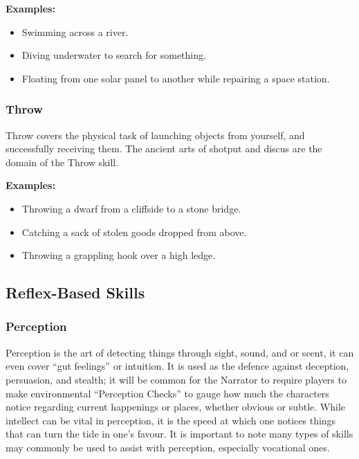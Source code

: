 \begin{displayquote}
    \textbf{Examples:}
    \begin{itemize}
        \item Swimming across a river.
        \item Diving underwater to search for something.
        \item Floating from one solar panel to another while repairing a space station.
    \end{itemize}
\end{displayquote}

\subsubsection{Throw} \label{subsubsec:throw}

Throw covers the physical task of launching objects from yourself, and successfully receiving them. The ancient arts of shotput and discus are the domain of the Throw skill.

\begin{displayquote}
    \textbf{Examples:}
    \begin{itemize}
        \item Throwing a dwarf from a cliffside to a stone bridge.
        \item Catching a sack of stolen goods dropped from above.
        \item Throwing a grappling hook over a high ledge.
    \end{itemize}
\end{displayquote}

\subsection{Reflex-Based Skills} \label{subsec:reflex-based_skills}

\subsubsection{Perception} \label{subsubsec:perception}

Perception is the art of detecting things through sight, sound, and or scent, it can even cover “gut feelings” or intuition. It is used as the defence against deception, persuasion, and stealth; it will be common for the Narrator to require players to make environmental “Perception Checks” to gauge how much the characters notice regarding current happenings or places, whether obvious or subtle. While intellect can be vital in perception, it is the speed at which one notices things that can turn the tide in one’s favour. It is important to note many types of skills may commonly be used to assist with perception, especially vocational ones.

